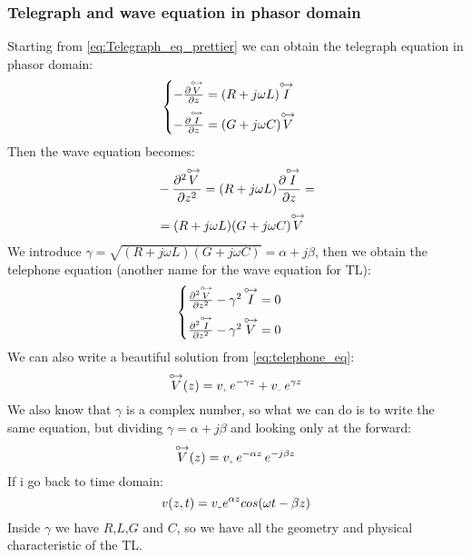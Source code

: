 \subsubsection*{Telegraph and wave equation in phasor domain}
Starting from \cref{eq:Telegraph_eq_prettier} we can obtain the telegraph equation in phasor domain:
\begin{equation}
  \begin{cases}
  -\frac{\partial \overset{\mathbin {{\circ \mkern-2.5mu\rightarrow}}}{V}}{\partial z}=(R+j\omega L)\overset{\mathbin {{\circ \mkern-2.5mu\rightarrow}}}{I}\\[5pt]
  -\frac{\partial \overset{\mathbin {{\circ \mkern-2.5mu\rightarrow}}}{I}}{\partial z}=(G+j\omega C)\overset{\mathbin {{\circ \mkern-2.5mu\rightarrow}}}{V}
  \end{cases}
\end{equation}
Then the wave equation becomes:
\begin{align}
  \begin{split}
    &-\frac{\partial^2 \overset{\mathbin {{\circ \mkern-2.5mu\rightarrow}}}{V}}{\partial z^2}=(R+j\omega L)\frac{\partial \overset{\mathbin {{\circ \mkern-2.5mu\rightarrow}}}{I}}{\partial z}=\\[5pt]
    &=(R+j\omega L)(G+j\omega C)\overset{\mathbin {{\circ \mkern-2.5mu\rightarrow}}}{V}
  \end{split}
\end{align}
We introduce $\gamma = \sqrt{(R+j\omega L)(G+j\omega C)}=\alpha+j\beta$, then we obtain the telephone equation (another name for the wave equation for TL):
\begin{equation}
  \begin{cases}
  \frac{\partial^2 \overset{\mathbin {{\circ \mkern-2.5mu\rightarrow}}}{V}}{\partial z^2}-\gamma^2\,\overset{\mathbin {{\circ \mkern-2.5mu\rightarrow}}}{I}=0\\[5pt]
  \frac{\partial^2 \overset{\mathbin {{\circ \mkern-2.5mu\rightarrow}}}{I}}{\partial z^2}-\gamma^2\,\overset{\mathbin {{\circ \mkern-2.5mu\rightarrow}}}{V}=0
  \end{cases}\label{eq:telephone_eq}
\end{equation}
We can also write a beautiful solution from \cref{eq:telephone_eq}:
\begin{equation}
  \phas{V}(z)=v_{\scaleto{+}{3pt}}\,e^{-\gamma z}+v_{\scaleto{-}{3pt}}\,e^{\gamma z}
\end{equation}
We also know that $\gamma$ is a complex number, so what we can do is to write the same equation, but dividing $\gamma = \alpha+j\beta$ and looking only at the forward:
\begin{equation}
  \phas{V}(z)=v_{\scaleto{+}{3pt}}\,e^{-\alpha z}\,e^{-j\beta z}
\end{equation}
If i go back to time domain:
\begin{equation}
  v(z,t)=v_{\scaleto{+}{3pt}}e^{\alpha z}cos(\omega t-\beta z)
\end{equation}
Inside $\gamma $ we have $R$,$L$,$G$ and $C$, so we have all the geometry and physical characteristic of the TL.
